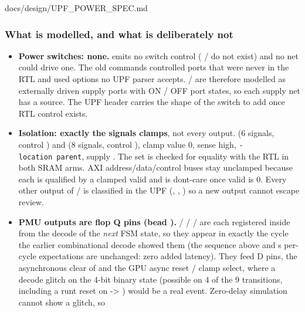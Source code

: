 \begin{relocated}{docs/design/UPF_POWER_SPEC.md}
\subsubsection{What is modelled, and what is deliberately not}\label{ds:ch:upf-power-spec:what-is-modelled-and-what-is-deliberately-not}

\begin{itemize}
\tightlist
\item
  \textbf{Power switches: none.}  emits no switch control
  ( /  do not exist) and no
   net could drive one. The old 
  commands controlled ports that were never in the RTL and used options
  no UPF parser accepts.  /  are therefore
  modelled as externally driven supply ports with ON / OFF port states,
  so each supply net has a source. The UPF header carries the shape of
  the switch to add once RTL control exists.
\item
  \textbf{Isolation: exactly the signals  clamps}, not
  every output.  (6 signals, control
  ) and  (8 signals, control
  ), clamp value 0, sense high,
  \texttt{-\allowbreak{}location\ parent}, supply . The set
  is checked for equality with the RTL in both SRAM arms. AXI
  address/\allowbreak{}data/\allowbreak{}control buses stay unclamped
  because each is qualified by a clamped valid and is
  don\textquotesingle t-care once valid is 0. Every other output of
   /  is classified in the UPF (,
  , ) so a new output cannot
  escape review.
\item
  \textbf{PMU outputs are flop Q pins (bead ).}
   /  /  /  are
  each registered inside  from the decode of the
  \emph{next} FSM state, so they appear in exactly the cycle the earlier
  combinational decode showed them (the sequence above and
  \textquotesingle s per-cycle expectations are
  unchanged: zero added latency). They feed  D pins, the
  asynchronous clear of  and the GPU async
  reset / clamp select, where a decode glitch on the 4-bit binary state
  (possible on 4 of the 9 transitions, including a runt reset on
   -\textgreater{} ) would be a
  real event. Zero-delay simulation cannot show a glitch, so

\end{itemize}
\end{relocated}
